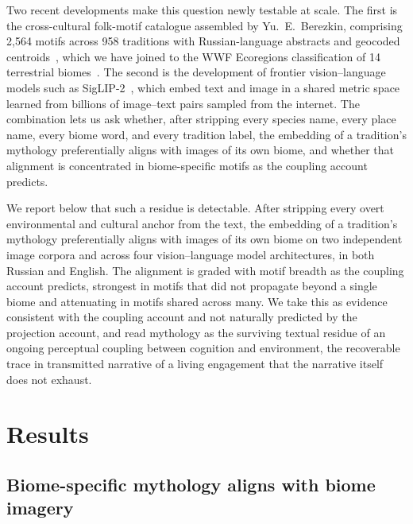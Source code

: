 \documentclass[11pt,a4paper]{article}
\begin{document}
Two recent developments make this question newly testable at scale.
The first is the cross-cultural folk-motif catalogue assembled by
Yu.\ E.\ Berezkin, comprising 2{,}564 motifs across 958 traditions
with Russian-language abstracts and geocoded
centroids~\citep{berezkin2024catalogue}, which we have joined to the
WWF Ecoregions classification of 14 terrestrial
biomes~\citep{olson2001terrestrial}. The second is the development of
frontier vision--language models such as
SigLIP-2~\citep{tschannen2024siglip2}, which embed text and image in a
shared metric space learned from billions of image--text pairs sampled
from the internet. The combination lets us ask whether, after
stripping every species name, every place name, every biome word, and
every tradition label, the embedding of a tradition's mythology
preferentially aligns with images of its own biome, and whether
that alignment is concentrated in biome-specific motifs as the
coupling account predicts.

We report below that such a residue is detectable. After stripping
every overt environmental and cultural anchor from the text, the embedding of a tradition's mythology
preferentially aligns with images of its own biome on two
independent image corpora and across four vision--language model
architectures, in both Russian and English. The alignment is
graded with motif breadth as the coupling account predicts,
strongest in motifs that did not propagate beyond a single biome
and attenuating in motifs shared across many. We take this as
evidence consistent with the coupling account and not naturally
predicted by the projection account, and read mythology as the
surviving textual residue of an ongoing perceptual coupling between
cognition and environment, the recoverable trace in transmitted
narrative of a living engagement that the narrative itself does
not exhaust.

\section*{Results}

\subsection*{Biome-specific mythology aligns with biome imagery}
\end{document}
